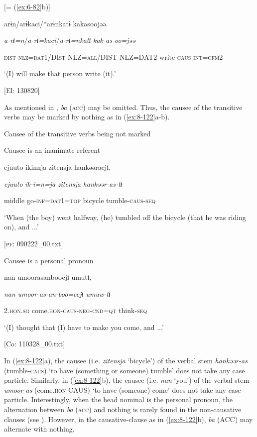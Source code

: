 \textbf{\ea\label{ex:8-121}
}  [= (\ref{ex:6-82}b)]

  {\TM}
\glll  arɨn/arɨkaci/*arɨnkatɨ  kakasoojəə.

    \textit{a-rɨ=n}/\textit{a-rɨ=kaci}/\textit{a-rɨ=nkatɨ}  \textit{kak-as{}-oo=jəə}

    \textsc{dist}-\textsc{nlz}=\textsc{dat}1/DI\textsc{st}-NLZ=\textsc{all}/DIST-NLZ=DAT2  write-\textsc{caus}-\textsc{int}=\textsc{cfm}2

    ‘(I) will make that person write (it).’

    [El: 130820]

  As mentioned in , \textit{ba} (\textsc{acc}) may be omitted. Thus, the causee of the transitive verbs may be marked by nothing as in (\ref{ex:8-122}a-b).

\ea\label{ex:8-122}
  Causee of the transitive verbs being not marked

\ea Causee is an inanimate referent

  {\TM}
\glll  cjuuto  ikinnja  {\textbar}zitensja{\textbar}  hankəəracjɨ,

    \textit{cjuuto}  \textit{ik-i=n=ja}  \textit{zitensja}  \textit{hankəər-as{}-tɨ}

    middle  go-\textsc{inf}=\textsc{dat}1=\textsc{top}  bicycle  tumble-\textsc{caus}-\textsc{seq}

    ‘When (the boy) went halfway, (he) tumbled off the bicycle (that he was riding on), and ...’

    [\textsc{pf}: 090222\_00.txt]
\z

\ex Causee is a personal pronoun

  {\TM}
\glll  nan  umoorasanboocjɨ  umutɨ,

    \textit{nan}  \textit{umoor-as{}-an-boo=ccjɨ  umuw-tɨ}

    2.\textsc{hon}.\textsc{sg}  come.\textsc{hon}-\textsc{caus}-\textsc{neg}-\textsc{cnd}=\textsc{qt}  think-\textsc{seq}

    ‘(I) thought that (I) have to make you come, and ...’

    [Co: 110328\_00.txt]
\z

In (\ref{ex:8-122}a), the causee (i.e. \textit{zitensja} ‘bicycle’) of the verbal stem \textit{hankəər-as} (tumble-\textsc{caus}) ‘to have (something or someone) tumble’ does not take any case particle. Similarly, in (\ref{ex:8-122}b), the causee (i.e. \textit{nan} ‘you’) of the verbal stem \textit{umoor-as} (come.\textsc{hon}-CAUS) ‘to have (someone) come’ does not take any case particle. Interestingly, when the head nominal is the personal pronoun, the alternation between \textit{ba} (\textsc{acc}) and nothing is rarely found in the non-causative clauses (see ). However, in the causative-clause as in (\ref{ex:8-122}b), \textit{ba} (ACC) may alternate with nothing.

